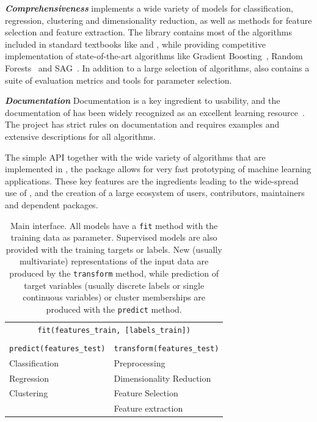 \emph{\textbf{Comprehensiveness}} \sklearn{} implements a wide variety of
models for classification, regression, clustering and dimensionality reduction,
as well as methods for feature selection and feature extraction. The library
contains most of the algorithms included in standard textbooks like
\textcite{bishop2001bishop} and \textcite{friedman2001elements}, while
providing competitive implementation of state-of-the-art algorithms like
Gradient Boosting~\autocite{friedman2001greedy}, Random
Forests~\autocite{breiman2001random} and SAG~\autocite{roux2012stochastic}.  In
addition to a large selection of algorithms, \sklearn{} also contains a suite
of evaluation metrics and tools for parameter selection.

\emph{\textbf{Documentation}}
Documentation is a key ingredient to usability, and the documentation of \sklearn{}
has been widely recognized as an excellent learning
resource~\autocite{testimonials, benlorica, kdnuggetstopten, lovesklearn}. The
\sklearn{} project has strict rules on documentation and requires examples and
extensive descriptions for all algorithms.

The simple API together with the wide variety of algorithms that are
implemented in \sklearn{}, the package allows for very fast prototyping of
machine learning applications.
These key features are the ingredients leading to the wide-spread use of
\sklearn{}, and the creation of a large ecosystem of users, contributors,
maintainers and dependent packages.

\begin{table}
    \caption{Main \sklearn interface. All models have a \texttt{fit} method
    with the training data as parameter. Supervised models are also provided
    with the training targets or labels. New (usually multivariate)
    representations of the input data are produced by the \texttt{transform}
    method, while prediction of target variables (usually discrete labels or
    single continuous variables) or cluster memberships are produced with the
    \texttt{predict} method.
}
\begin{center}
    \begin{tabular}{p{} p{}}
    \multicolumn{2}{c}{\texttt{fit(features\_train, [labels\_train])}}\\\\
    \texttt{predict(features\_test)} & \texttt{transform(features\_test)}\\
    \cmidrule[1pt](r{1em}){1-1} \cmidrule[1pt](l){2-2}
    Classification & Preprocessing\\
    Regression & Dimensionality Reduction\\
    Clustering & Feature Selection\\
               & Feature extraction\\
\end{tabular}
\end{center}
\label{api}
\end{table}
\pagebreak


